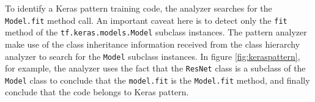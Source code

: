 To identify a Keras pattern training code, the analyzer searches for the
{\tt Model.fit} method call. An important caveat here is to 
detect only the {\tt fit} method of the {\tt tf.keras.models.Model} 
subclass instances. The pattern analyzer make use of the class inheritance
information received from the class hierarchy analyzer to search for
the {\tt Model} subclass instances. In figure \ref{fig:keraspattern},
for example, the analyzer uses the fact that the {\tt ResNet} class is
a subclass of the {\tt Model} class to conclude that the {\tt model.fit}
is the {\tt Model.fit} method, and finally conclude that the code
belongs to Keras pattern.



